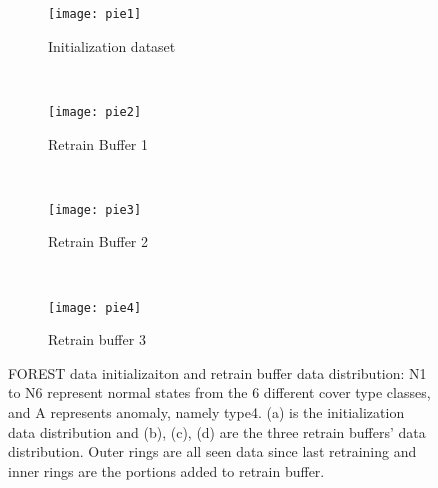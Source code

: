 \begin{figure}[ht]
\centering
	\begin {subfigure}[t]{0.45\textwidth}
	\centering
	\texttt{[image: pie1]}
	\caption{Initialization dataset}
	\label{fig:init}
	\end{subfigure}
	~
	\begin {subfigure}[t]{0.45\textwidth}
	\centering
	\texttt{[image: pie2]}
	\caption{Retrain Buffer 1}
	\label{fig:buf1}
	\end{subfigure}
	~
	\begin {subfigure}[t]{0.45\textwidth}
	\centering
	\texttt{[image: pie3]}
	\caption{Retrain Buffer 2}
	\label{fig:buf2}
	\end{subfigure}
	~
	\begin {subfigure}[t]{0.45\textwidth}
	\centering
	\texttt{[image: pie4]}
	\caption{Retrain buffer 3}
	\label{fig:buf3}
	\end{subfigure}

	\caption[FOREST data initializaiton and retrain buffer data distribution]{FOREST data initializaiton and retrain buffer data distribution: N1 to N6 represent normal states from the 6 different cover type classes, and A represents anomaly, namely type4. (a) is the initialization data distribution and (b), (c), (d) are the three retrain buffers' data distribution. Outer rings are all seen data since last retraining and inner rings are the portions added to retrain buffer.}
\label{fig:bufs}
\end{figure}








